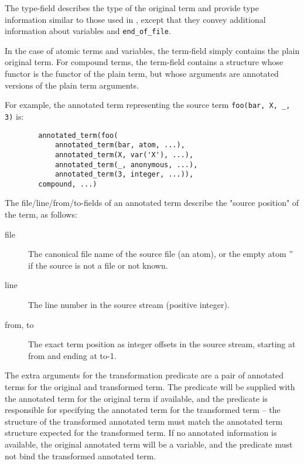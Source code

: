 The type-field describes the type of the original term and provide type
information similar to those used in , except that they convey additional information about variables and {\tt end_of_file}.

    In the case of atomic terms and variables, the term-field simply
    contains the plain original term. For compound terms, the term-field
    contains a structure whose functor is the functor of the plain term,
    but whose arguments are annotated versions of the plain term arguments.

    For example, the annotated term representing the source term  {\tt foo(bar, X, _, 3)} is:

\begin{verbatim}
        annotated_term(foo(
            annotated_term(bar, atom, ...),
            annotated_term(X, var('X'), ...),
            annotated_term(_, anonymous, ...),
            annotated_term(3, integer, ...)),
        compound, ...)
\end{verbatim}

The file/line/from/to-fields of an annotated term describe the
"source position" of the term, as follows:

\begin{description}
\item[file]
    The canonical file name of the source file (an atom), or the
    empty atom '' if the source is not a file or not known.

\item[line]
    The line number in the source stream (positive integer).

\item[from, to]
    The exact term position as integer offsets in the source stream,
    starting at from and ending at to-1.
\end{description}

The extra arguments for the transformation predicate are a pair of
annotated terms for the original and transformed term. The predicate will
be supplied with the annotated term for the original term if available,
and the predicate is responsible for specifying the annotated term for the
transformed term -- the structure of the transformed annotated term must
match the annotated term structure expected for the transformed term. If
no annotated information is available, the original annotated term will be
a variable, and the predicate must not bind the transformed annotated term.

